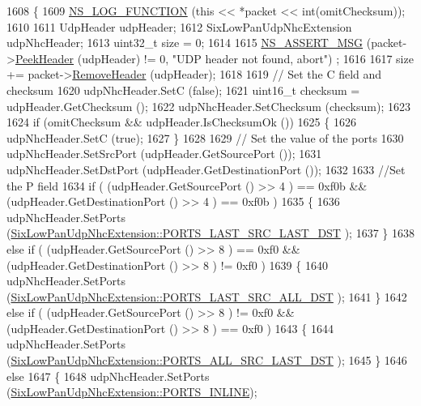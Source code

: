 \begin{DoxyCode}
1608 \{
1609   \hyperlink{log-macros-disabled_8h_a90b90d5bad1f39cb1b64923ea94c0761}{NS\_LOG\_FUNCTION} (\textcolor{keyword}{this} << *packet << \textcolor{keywordtype}{int}(omitChecksum));
1610 
1611   UdpHeader udpHeader;
1612   SixLowPanUdpNhcExtension udpNhcHeader;
1613   uint32\_t size = 0;
1614 
1615   \hyperlink{assert_8h_aff5ece9066c74e681e74999856f08539}{NS\_ASSERT\_MSG} (packet->\hyperlink{classns3_1_1Packet_aadc63487bea70945c418f4c3e9b81964}{PeekHeader} (udpHeader) != 0, \textcolor{stringliteral}{"UDP header not found, abort"})
      ;
1616 
1617   size += packet->\hyperlink{classns3_1_1Packet_a0961eccf975d75f902d40956c93ba63e}{RemoveHeader} (udpHeader);
1618 
1619   \textcolor{comment}{// Set the C field and checksum}
1620   udpNhcHeader.SetC (\textcolor{keyword}{false});
1621   uint16\_t checksum = udpHeader.GetChecksum ();
1622   udpNhcHeader.SetChecksum (checksum);
1623 
1624   \textcolor{keywordflow}{if} (omitChecksum && udpHeader.IsChecksumOk ())
1625     \{
1626       udpNhcHeader.SetC (\textcolor{keyword}{true});
1627     \}
1628 
1629   \textcolor{comment}{// Set the value of the ports}
1630   udpNhcHeader.SetSrcPort (udpHeader.GetSourcePort ());
1631   udpNhcHeader.SetDstPort (udpHeader.GetDestinationPort ());
1632 
1633   \textcolor{comment}{//Set the P field}
1634   \textcolor{keywordflow}{if} ( (udpHeader.GetSourcePort () >> 4 ) == 0xf0b && (udpHeader.GetDestinationPort () >> 4 ) == 0xf0b )
1635     \{
1636       udpNhcHeader.SetPorts (\hyperlink{classns3_1_1SixLowPanUdpNhcExtension_a77005f9c06de72b1a6ea105a23bf413baef8af6ce660592f4b15a9953fdb94020}{SixLowPanUdpNhcExtension::PORTS\_LAST\_SRC\_LAST\_DST}
      );
1637     \}
1638   \textcolor{keywordflow}{else} \textcolor{keywordflow}{if} ( (udpHeader.GetSourcePort () >> 8 ) == 0xf0 && (udpHeader.GetDestinationPort () >> 8 ) != 0xf0 )
1639     \{
1640       udpNhcHeader.SetPorts (\hyperlink{classns3_1_1SixLowPanUdpNhcExtension_a77005f9c06de72b1a6ea105a23bf413ba2f35b94c80f56d7da66128f77b0d1f8f}{SixLowPanUdpNhcExtension::PORTS\_LAST\_SRC\_ALL\_DST}
      );
1641     \}
1642   \textcolor{keywordflow}{else} \textcolor{keywordflow}{if} ( (udpHeader.GetSourcePort () >> 8 ) != 0xf0 && (udpHeader.GetDestinationPort () >> 8 ) == 0xf0 )
1643     \{
1644       udpNhcHeader.SetPorts (\hyperlink{classns3_1_1SixLowPanUdpNhcExtension_a77005f9c06de72b1a6ea105a23bf413bae7a4cf154bbe4889459921e80e198fd6}{SixLowPanUdpNhcExtension::PORTS\_ALL\_SRC\_LAST\_DST}
      );
1645     \}
1646   \textcolor{keywordflow}{else}
1647     \{
1648       udpNhcHeader.SetPorts (\hyperlink{classns3_1_1SixLowPanUdpNhcExtension_a77005f9c06de72b1a6ea105a23bf413ba6579ce5e13ed97d8d896694c08d24caf}{SixLowPanUdpNhcExtension::PORTS\_INLINE});

\end{DoxyCode}
